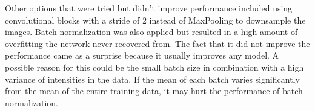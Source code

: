 Other options that were tried but didn't improve performance included using convolutional blocks with a stride of 2 instead of MaxPooling to downsample the images. Batch normalization was also applied but resulted in a high amount of overfitting the network never recovered from. The fact that it did not improve the performance came as a surprise because it usually improves any model. A possible reason for this could be the small batch size in combination with a high variance of intensities in the data. If the mean of each batch varies significantly from the mean of the entire training data, it may hurt the performance of batch normalization.

\newpage
